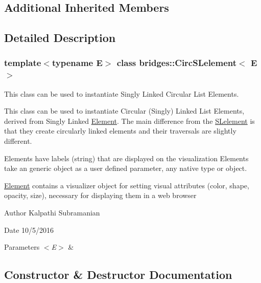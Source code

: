 \subsection*{Additional Inherited Members}


\subsection{Detailed Description}
\subsubsection*{template$<$typename E$>$\newline
class bridges\+::\+Circ\+S\+Lelement$<$ E $>$}

This class can be used to instantiate Singly Linked Circular List Elements. 

This class can be used to instantiate Circular (Singly) Linked List Elements, derived from Singly Linked \mbox{\hyperlink{classbridges_1_1_element}{Element}}. The main difference from the \mbox{\hyperlink{classbridges_1_1_s_lelement}{S\+Lelement}} is that they create circularly linked elements and their traversals are slightly different.

Elements have labels (string) that are displayed on the visualization Elements take an generic object as a user defined parameter, any native type or object.

\mbox{\hyperlink{classbridges_1_1_element}{Element}} contains a visualizer object for setting visual attributes (color, shape, opacity, size), necessary for displaying them in a web browser

\begin{DoxyAuthor}{Author}
Kalpathi Subramanian 
\end{DoxyAuthor}
\begin{DoxyDate}{Date}
10/5/2016
\end{DoxyDate}

\begin{DoxyParams}{Parameters}
{\em $<$\+E$>$} & \\
\hline
\end{DoxyParams}


\subsection{Constructor \& Destructor Documentation}
\mbox{\label{classbridges_1_1_circ_s_lelement_a86183d3487b906550d8f32bda3a68f98}} 
